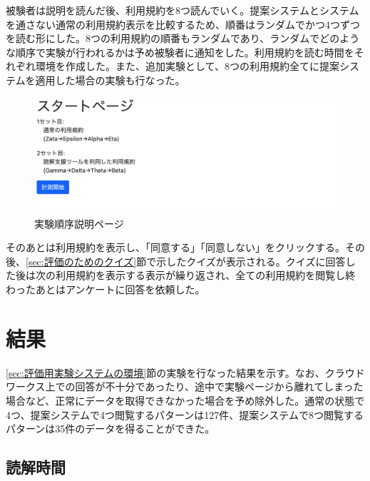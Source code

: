 被験者は説明を読んだ後、利用規約を8つ読んでいく。提案システムとシステムを通さない通常の利用規約表示を比較するため、順番はランダムでかつ4つずつを読む形にした。8つの利用規約の順番もランダムであり、ランダムでどのような順序で実験が行われるかは予め被験者に通知をした。利用規約を読む時間をそれぞれ環境を作成した。また、追加実験として、8つの利用規約全てに提案システムを適用した場合の実験も行なった。
\begin{figure}[h]
  \begin{center}
      \includegraphics[width=16cm]{img/teststart2.png}
      \caption{実験順序説明ページ}
      \label{img:実験順序説明ページ}
  \end{center}
\end{figure}

そのあとは利用規約を表示し、「同意する」「同意しない」をクリックする。その後、\ref{sec:評価のためのクイズ}節で示したクイズが表示される。クイズに回答した後は次の利用規約を表示する表示が繰り返され、全ての利用規約を閲覧し終わったあとはアンケートに回答を依頼した。

\section{結果}
\ref{sec:評価用実験システムの環境}節の実験を行なった結果を示す。なお、クラウドワークス上での回答が不十分であったり、途中で実験ページから離れてしまった場合など、正常にデータを取得できなかった場合を予め除外した。通常の状態で4つ、提案システムで4つ閲覧するパターンは127件、提案システムで8つ閲覧するパターンは35件のデータを得ることができた。

\subsection{読解時間}

